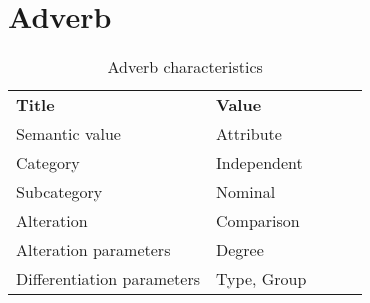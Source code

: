 \section{Adverb}

\begin{table}[h]
	\caption{Adverb characteristics}
	\begin{tabular}{lllll}
		\textbf{Title}              & \textbf{Value}      \\
		Semantic value              & Attribute           \\
		Category                    & Independent         \\
		Subcategory                 & Nominal             \\
		Alteration                  & Comparison          \\
		Alteration parameters       & Degree              \\
		Differentiation parameters  & Type, Group
	\end{tabular}
\end{table}
